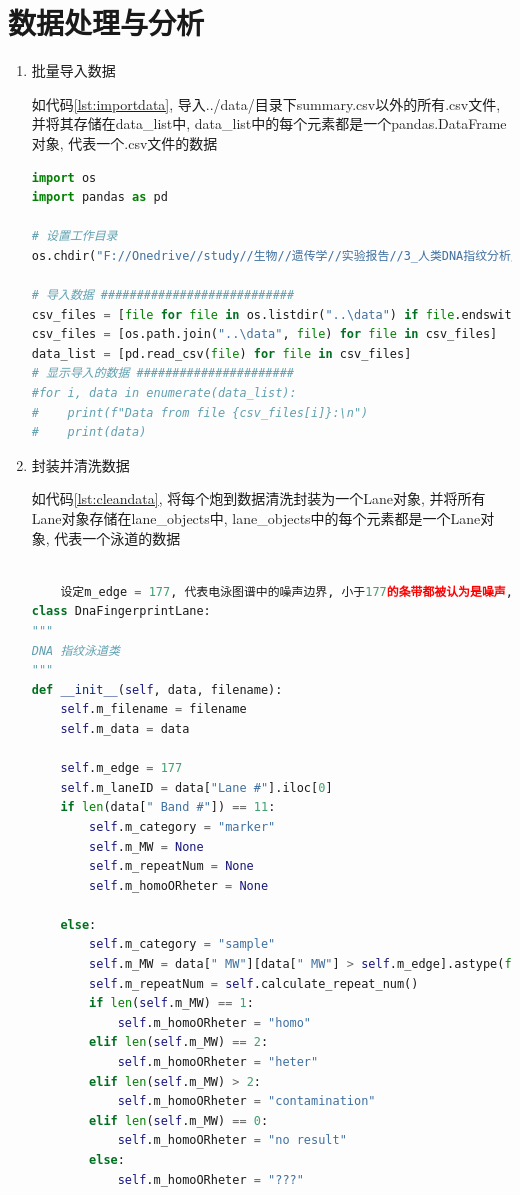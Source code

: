 \documentclass[AutoFakeBold]{LZUThesis}
\begin{document}
\section{数据处理与分析}
\begin{enumerate}
    \item 批量导入数据\par
    如代码\ref{lst:importdata}, 导入../data/目录下summary.csv以外的所有.csv文件, 并将其存储在data\_list中, data\_list中的每个元素都是一个pandas.DataFrame对象, 代表一个.csv文件的数据
    \begin{lstlisting}[language=python, caption={批量导入数据}, label={lst:importdata}, style=myPythonStyle]
import os
import pandas as pd

# 设置工作目录
os.chdir("F://Onedrive//study//生物//遗传学//实验报告//3_人类DNA指纹分析//python")

# 导入数据 ###########################
csv_files = [file for file in os.listdir("..\data") if file.endswith(".csv") and file != "summary.csv"]
csv_files = [os.path.join("..\data", file) for file in csv_files]
data_list = [pd.read_csv(file) for file in csv_files]
# 显示导入的数据 ######################
#for i, data in enumerate(data_list):
#    print(f"Data from file {csv_files[i]}:\n")
#    print(data)
    \end{lstlisting}

    \item 封装并清洗数据\par
    如代码\ref{lst:cleandata}, 将每个炮到数据清洗封装为一个Lane对象, 并将所有Lane对象存储在lane\_objects中, lane\_objects中的每个元素都是一个Lane对象, 代表一个泳道的数据
    \begin{lstlisting}[language=python, caption={封装并清洗数据}, label={lst:cleandata}, style=myPythonStyle]
    
    设定m_edge = 177, 代表电泳图谱中的噪声边界, 小于177的条带都被认为是噪声, 将在数据处理中被过滤掉
class DnaFingerprintLane:
"""
DNA 指纹泳道类
"""
def __init__(self, data, filename):
    self.m_filename = filename
    self.m_data = data
    
    self.m_edge = 177
    self.m_laneID = data["Lane #"].iloc[0]
    if len(data[" Band #"]) == 11:
        self.m_category = "marker"
        self.m_MW = None
        self.m_repeatNum = None
        self.m_homoORheter = None
    
    else:
        self.m_category = "sample"
        self.m_MW = data[" MW"][data[" MW"] > self.m_edge].astype(float).tolist()
        self.m_repeatNum = self.calculate_repeat_num()
        if len(self.m_MW) == 1:
            self.m_homoORheter = "homo"
        elif len(self.m_MW) == 2:
            self.m_homoORheter = "heter"
        elif len(self.m_MW) > 2:
            self.m_homoORheter = "contamination"
        elif len(self.m_MW) == 0:
            self.m_homoORheter = "no result"
        else:
            self.m_homoORheter = "???"
    

\end{lstlisting}
\end{enumerate}
\end{document}
